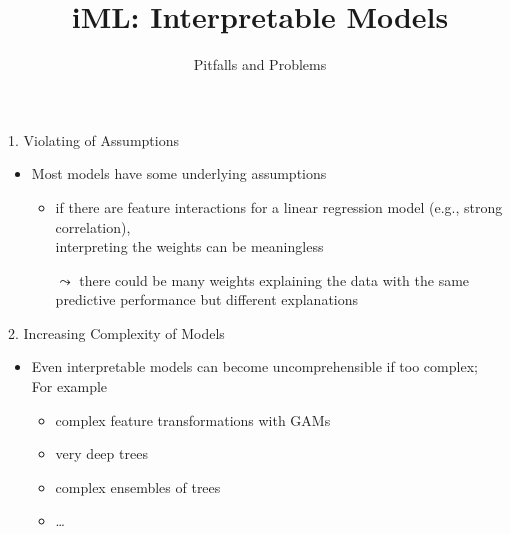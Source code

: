 \documentclass[aspectratio=169]{../latex_main/tntbeamer}  %
\title[Introduction]{iML: Interpretable Models}
\subtitle{Pitfalls and Problems}
\begin{document}
	
	\maketitle

    
    \begin{frame}[c]{1. Violating of Assumptions}
    
        \begin{itemize}
            \item Most models have some underlying assumptions
            \begin{itemize}
                \item if there are feature interactions for a linear regression model (e.g., strong correlation),\\ interpreting the weights can be meaningless
                \item[$\leadsto$] there could be many weights explaining the data with the same predictive performance but different explanations
            \end{itemize}
        \end{itemize}
    
    \end{frame}
    
    
    \begin{frame}[c]{2. Increasing Complexity of Models}
    
        \begin{itemize}
            \item Even interpretable models can become uncomprehensible if too complex;\\
            For example
            \begin{itemize}
                \item complex feature transformations with GAMs
                \item very deep trees
                \item complex ensembles of trees
                \item \ldots
            \end{itemize}
            
        \end{itemize}
    
    \end{frame}
    
\end{document}
